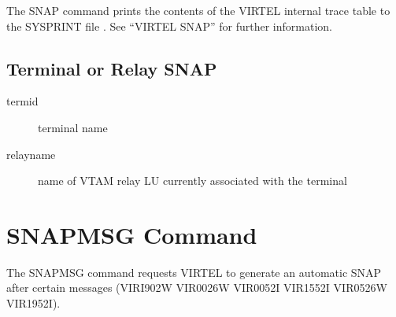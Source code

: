 \documentclass[letterpaper,10pt,english]{sphinxmanual}
\begin{document}
\begin{sphinxVerbatim}[commandchars=\\\{\}]
\end{sphinxVerbatim}

The SNAP command prints the contents of the VIRTEL internal trace table to the SYSPRINT file . See “VIRTEL SNAP” for further information.


\subsection{Terminal or Relay SNAP}
\label{\detokenize{audit_operations_ and_performance:terminal-or-relay-snap}}
\begin{sphinxVerbatim}[commandchars=\\\{\}]
  
\end{sphinxVerbatim}
\begin{description}
\item[{termid}] \leavevmode
terminal name

\item[{relayname}] \leavevmode
name of VTAM relay LU currently associated with the terminal

\end{description}

\ignorespaces 

\section{SNAPMSG Command}
\label{\detokenize{audit_operations_ and_performance:snapmsg-command}}\label{\detokenize{audit_operations_ and_performance:index-20}}
\begin{sphinxVerbatim}[commandchars=\\\{\}]
\end{sphinxVerbatim}

The SNAPMSG command requests VIRTEL to generate an automatic SNAP after certain messages (VIRI902W VIR0026W VIR0052I VIR1552I VIR0526W VIR1952I).

\begin{sphinxVerbatim}[commandchars=\\\{\}]
\end{sphinxVerbatim}
\end{document}
